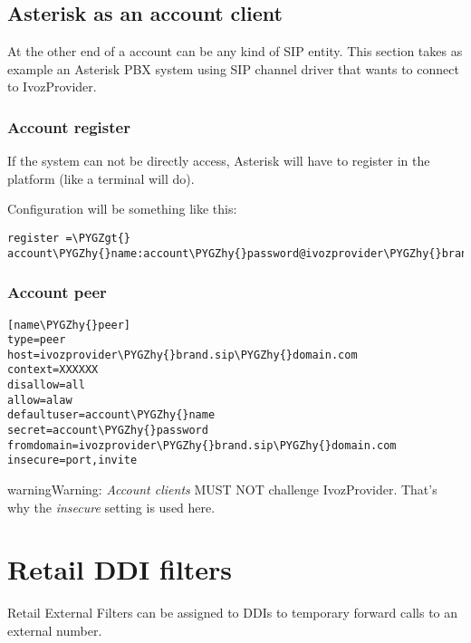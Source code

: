 \documentclass[letterpaper,10pt,english]{sphinxmanual}
\def\PYGZgt{\char`\>}
\def\PYGZhy{\char`\-}
\begin{document}
\subsection{Asterisk as an account client}
\label{retail/retail_accounts:asterisk-as-an-account-client}
At the other end of a account can be any kind of SIP entity. This section takes
as example an Asterisk PBX system using SIP channel driver that wants to connect
to IvozProvider.


\subsubsection{Account register}
\label{retail/retail_accounts:account-register}
If the system can not be directly access, Asterisk will have to register in the
platform (like a terminal will do).

Configuration will be something like this:

\begin{Verbatim}[commandchars=\\\{\}]
register =\PYGZgt{} account\PYGZhy{}name:account\PYGZhy{}password@ivozprovider\PYGZhy{}brand.sip\PYGZhy{}domain.com
\end{Verbatim}


\subsubsection{Account peer}
\label{retail/retail_accounts:account-peer}
\begin{Verbatim}[commandchars=\\\{\}]
[name\PYGZhy{}peer]
type=peer
host=ivozprovider\PYGZhy{}brand.sip\PYGZhy{}domain.com
context=XXXXXX
disallow=all
allow=alaw
defaultuser=account\PYGZhy{}name
secret=account\PYGZhy{}password
fromdomain=ivozprovider\PYGZhy{}brand.sip\PYGZhy{}domain.com
insecure=port,invite
\end{Verbatim}

\begin{notice}{warning}{Warning:}
\emph{Account clients} MUST NOT challenge IvozProvider. That's
why the \emph{insecure} setting is used here.
\end{notice}


\section{Retail DDI filters}
\label{retail/retail_filters:retail-ddi-filters}\label{retail/retail_filters::doc}\label{retail/retail_filters:retail-filters}
Retail External Filters can be assigned to DDIs to temporary
forward calls to an external number.
\end{document}
